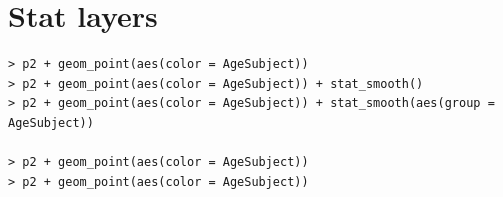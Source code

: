 \documentclass[oneside, 10pt]{article}
\begin{document}
\section{Stat layers}

\begin{verbatim}
> p2 + geom_point(aes(color = AgeSubject))
> p2 + geom_point(aes(color = AgeSubject)) + stat_smooth()
> p2 + geom_point(aes(color = AgeSubject)) + stat_smooth(aes(group = AgeSubject))

> p2 + geom_point(aes(color = AgeSubject))
> p2 + geom_point(aes(color = AgeSubject))
\end{verbatim}
\end{document}
